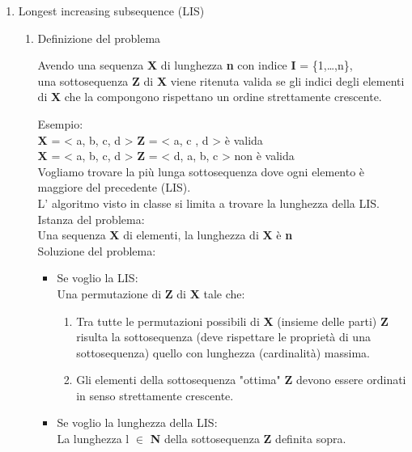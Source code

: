\documentclass[11pt]{article}
\begin{document}
\begin{enumerate}
\item Longest increasing subsequence (LIS)
\label{sec:orgc8e2147}

\begin{enumerate}
\item Definizione del problema
\label{sec:orgf7e5ee8}

Avendo una sequenza \textbf{X} di lunghezza \textbf{n} con indice \textbf{I} = \{1,\ldots{},n\}, \\
una sottosequenza \textbf{Z} di \textbf{X} viene ritenuta valida se gli indici degli elementi
di \textbf{X} che la compongono rispettano un ordine strettamente crescente.

Esempio: \\
\textbf{X} = < a, b, c, d >  \textbf{Z} = < a, c , d > è valida \\
\textbf{X} = < a, b, c, d >  \textbf{Z} = < d, a, b, c > non è valida \\

Vogliamo trovare la più lunga sottosequenza dove ogni elemento è maggiore del precedente (LIS).\\
L' algoritmo visto in classe si limita a trovare la lunghezza della LIS. \\

Istanza del problema: \\
Una sequenza \textbf{X} di elementi, la lunghezza di \textbf{X} è \textbf{n} \\

Soluzione del problema: \\
\begin{itemize}
\item Se voglio la LIS: \\
Una permutazione di \textbf{Z} di \textbf{X} tale che:
\begin{enumerate}
\item Tra tutte le permutazioni possibili di \textbf{X} (insieme delle parti) \textbf{Z} risulta la sottosequenza (deve rispettare le proprietà di una sottosequenza) quello con lunghezza (cardinalità) massima.
\item Gli elementi della sottosequenza "ottima" \textbf{Z} devono essere ordinati in senso strettamente crescente.
\end{enumerate}

\item Se voglio la lunghezza della LIS: \\
La lunghezza l \(\in\) \textbf{N} della sottosequenza \textbf{Z} definita sopra.
\end{itemize}



\end{enumerate}
\end{enumerate}
\end{document}
